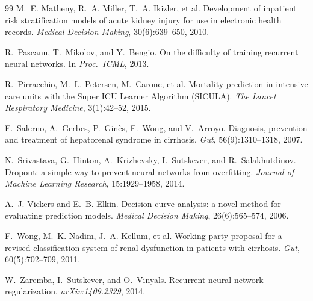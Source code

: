 \documentclass{article}
\begin{document}
\begin{thebibliography}{99}
M.~E. Matheny, R.~A. Miller, T.~A. Ikizler, et al.
\newblock Development of inpatient risk stratification models of acute kidney
injury for use in electronic health records.
\newblock \emph{Medical Decision Making}, 30(6):639--650, 2010.

R.~Pascanu, T.~Mikolov, and Y.~Bengio.
\newblock On the difficulty of training recurrent neural networks.
\newblock In \emph{Proc.\ ICML}, 2013.

R.~Pirracchio, M.~L. Petersen, M.~Carone, et al.
\newblock Mortality prediction in intensive care units with the Super ICU Learner
Algorithm (SICULA).
\newblock \emph{The Lancet Respiratory Medicine}, 3(1):42--52, 2015.

F.~Salerno, A.~Gerbes, P.~Gin\`es, F.~Wong, and V.~Arroyo.
\newblock Diagnosis, prevention and treatment of hepatorenal syndrome in cirrhosis.
\newblock \emph{Gut}, 56(9):1310--1318, 2007.

N.~Srivastava, G.~Hinton, A.~Krizhevsky, I.~Sutskever, and R.~Salakhutdinov.
\newblock Dropout: a simple way to prevent neural networks from overfitting.
\newblock \emph{Journal of Machine Learning Research}, 15:1929--1958, 2014.

A.~J. Vickers and E.~B. Elkin.
\newblock Decision curve analysis: a novel method for evaluating prediction models.
\newblock \emph{Medical Decision Making}, 26(6):565--574, 2006.

F.~Wong, M.~K. Nadim, J.~A. Kellum, et al.
\newblock Working party proposal for a revised classification system of renal
dysfunction in patients with cirrhosis.
\newblock \emph{Gut}, 60(5):702--709, 2011.

W.~Zaremba, I.~Sutskever, and O.~Vinyals.
\newblock Recurrent neural network regularization.
\newblock \emph{arXiv:1409.2329}, 2014.

\end{thebibliography}
\end{document}
